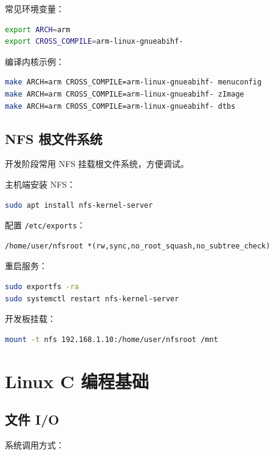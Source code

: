\documentclass[UTF8,a4paper,12pt]{ctexart}
\begin{document}
常见环境变量：

\begin{lstlisting}[language=bash]
export ARCH=arm
export CROSS_COMPILE=arm-linux-gnueabihf-
\end{lstlisting}

编译内核示例：

\begin{lstlisting}[language=bash]
make ARCH=arm CROSS_COMPILE=arm-linux-gnueabihf- menuconfig
make ARCH=arm CROSS_COMPILE=arm-linux-gnueabihf- zImage
make ARCH=arm CROSS_COMPILE=arm-linux-gnueabihf- dtbs
\end{lstlisting}

\subsection{NFS 根文件系统}

开发阶段常用 NFS 挂载根文件系统，方便调试。

主机端安装 NFS：

\begin{lstlisting}[language=bash]
sudo apt install nfs-kernel-server
\end{lstlisting}

配置 \texttt{/etc/exports}：

\begin{lstlisting}
/home/user/nfsroot *(rw,sync,no_root_squash,no_subtree_check)
\end{lstlisting}

重启服务：

\begin{lstlisting}[language=bash]
sudo exportfs -ra
sudo systemctl restart nfs-kernel-server
\end{lstlisting}

开发板挂载：

\begin{lstlisting}[language=bash]
mount -t nfs 192.168.1.10:/home/user/nfsroot /mnt
\end{lstlisting}

\section{Linux C 编程基础}

\subsection{文件 I/O}

系统调用方式：
\end{document}
